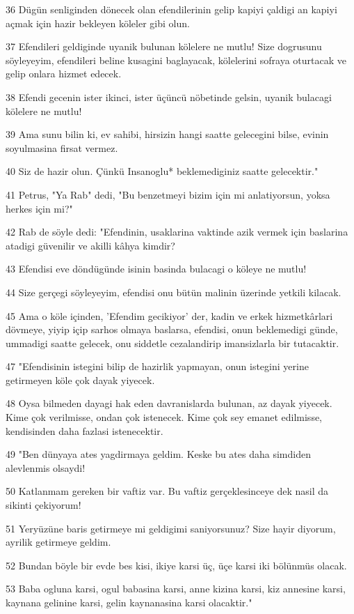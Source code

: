 \par 36 Dügün senliginden dönecek olan efendilerinin gelip kapiyi çaldigi an kapiyi açmak için hazir bekleyen köleler gibi olun.
\par 37 Efendileri geldiginde uyanik bulunan kölelere ne mutlu! Size dogrusunu söyleyeyim, efendileri beline kusagini baglayacak, kölelerini sofraya oturtacak ve gelip onlara hizmet edecek.
\par 38 Efendi gecenin ister ikinci, ister üçüncü nöbetinde gelsin, uyanik bulacagi kölelere ne mutlu!
\par 39 Ama sunu bilin ki, ev sahibi, hirsizin hangi saatte gelecegini bilse, evinin soyulmasina firsat vermez.
\par 40 Siz de hazir olun. Çünkü Insanoglu* beklemediginiz saatte gelecektir."
\par 41 Petrus, "Ya Rab" dedi, "Bu benzetmeyi bizim için mi anlatiyorsun, yoksa herkes için mi?"
\par 42 Rab de söyle dedi: "Efendinin, usaklarina vaktinde azik vermek için baslarina atadigi güvenilir ve akilli kâhya kimdir?
\par 43 Efendisi eve döndügünde isinin basinda bulacagi o köleye ne mutlu!
\par 44 Size gerçegi söyleyeyim, efendisi onu bütün malinin üzerinde yetkili kilacak.
\par 45 Ama o köle içinden, 'Efendim gecikiyor' der, kadin ve erkek hizmetkârlari dövmeye, yiyip içip sarhos olmaya baslarsa, efendisi, onun beklemedigi günde, ummadigi saatte gelecek, onu siddetle cezalandirip imansizlarla bir tutacaktir.
\par 47 "Efendisinin istegini bilip de hazirlik yapmayan, onun istegini yerine getirmeyen köle çok dayak yiyecek.
\par 48 Oysa bilmeden dayagi hak eden davranislarda bulunan, az dayak yiyecek. Kime çok verilmisse, ondan çok istenecek. Kime çok sey emanet edilmisse, kendisinden daha fazlasi istenecektir.
\par 49 "Ben dünyaya ates yagdirmaya geldim. Keske bu ates daha simdiden alevlenmis olsaydi!
\par 50 Katlanmam gereken bir vaftiz var. Bu vaftiz gerçeklesinceye dek nasil da sikinti çekiyorum!
\par 51 Yeryüzüne baris getirmeye mi geldigimi saniyorsunuz? Size hayir diyorum, ayrilik getirmeye geldim.
\par 52 Bundan böyle bir evde bes kisi, ikiye karsi üç, üçe karsi iki bölünmüs olacak.
\par 53 Baba ogluna karsi, ogul babasina karsi, anne kizina karsi, kiz annesine karsi, kaynana gelinine karsi, gelin kaynanasina karsi olacaktir."

